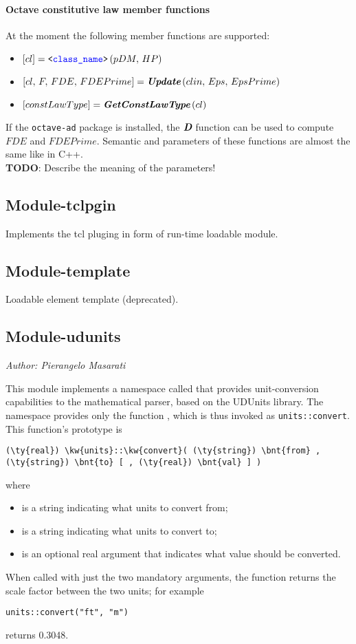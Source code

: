 \paragraph{Octave constitutive law member functions}
At the moment the following member functions are supported:
\begin{itemize}
\item $\left[cl\right] = \texttt{<\textcolor{blue}{class\_name}>}\left(pDM,\,HP\right)$
\item $\left[cl,\,F,\,FDE,\,FDEPrime\right] = \textit{\textbf{Update}}\left(clin,\,Eps,\,EpsPrime\right)$
\item $\left[constLawType\right] = \textit{\textbf{GetConstLawType}}\left(cl\right)$
\end{itemize}
If the \texttt{octave-ad} package is installed, the $\textit{\textbf{D}}$ function can be used to compute $FDE$ and $FDEPrime$.
Semantic and parameters of these functions are almost the same like in C++. \\
\textbf{TODO}: Describe the meaning of the parameters!

\subsection{Module-tclpgin}
Implements the tcl pluging in form of run-time loadable module.
 
\subsection{Module-template}
Loadable element template (deprecated).

\subsection{Module-udunits}
\emph{Author: Pierangelo Masarati}

\noindent
This module implements a namespace called 
that provides unit-conversion capabilities
to the mathematical parser, based on the UDUnits library.
The namespace provides only the function ,
which is thus invoked as \texttt{units::convert}.
This function's prototype is
\begin{Verbatim}[commandchars=\\\{\}]
    (\ty{real}) \kw{units}::\kw{convert}( (\ty{string}) \bnt{from} , (\ty{string}) \bnt{to} [ , (\ty{real}) \bnt{val} ] )
\end{Verbatim}
where
\begin{itemize}
\item {} is a string indicating what units to convert from;
\item {} is a string indicating what units to convert to;
\item {} is an optional real argument that indicates what value should be converted.
\end{itemize}
When called with just the two mandatory arguments, the function returns the
scale factor between the two units; for example
\begin{Verbatim}[commandchars=\\\{\}]
    units::convert("ft", "m")
\end{Verbatim}
returns 0.3048.

